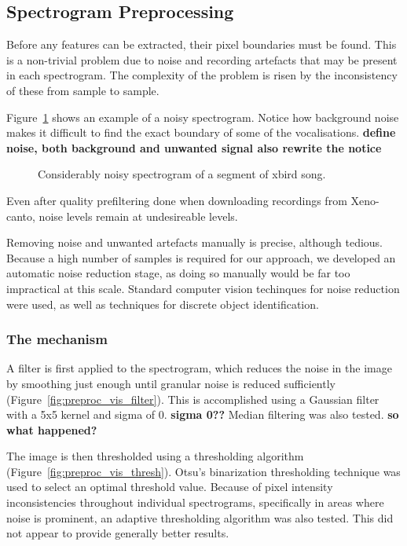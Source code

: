 \subsection{Spectrogram Preprocessing}\label{sec:preproc}

Before any features can be extracted, their pixel boundaries must be found.
This is a non-trivial problem due to noise and recording artefacts
that may be present in each spectrogram.
The complexity of the problem is risen by the inconsistency of these from sample
to sample.

Figure~\ref{fig:sgram_noise} shows an example of a noisy spectrogram.
Notice how background noise makes it difficult to find the exact boundary of
some of the vocalisations.
\textbf{define noise, both background and unwanted signal also rewrite the notice}

\begin{figure}[h]
  \centering

  \caption{Considerably noisy spectrogram of a segment of xbird song.}
  \label{fig:sgram_noise}
\end{figure}

Even after quality prefiltering done when downloading recordings from
Xeno-canto, noise levels remain at undesireable levels.

Removing noise and unwanted artefacts manually is precise, although tedious.
Because a high number of samples is required for our approach, we developed an
automatic noise reduction stage, as doing so manually would be far too
impractical at this scale.
Standard computer vision techinques for noise reduction were used, as well as
techniques for discrete object identification.

\subsubsection{The mechanism}
A filter is first applied to the spectrogram, which reduces the noise in the
image by smoothing just enough until granular noise is reduced sufficiently
(Figure~\ref{fig:preproc_vis_filter}).
This is accomplished using a Gaussian filter with a 5x5 kernel and sigma of 0.
\textbf{sigma 0??}
Median filtering was also tested. \textbf{so what happened?}

The image is then thresholded using a thresholding algorithm
(Figure~\ref{fig:preproc_vis_thresh}).
Otsu's binarization thresholding technique was used to select an optimal
threshold value.
Because of pixel intensity inconsistencies throughout individual spectrograms,
specifically in areas where noise is prominent, an adaptive thresholding
algorithm was also tested.
This did not appear to provide generally better results.

